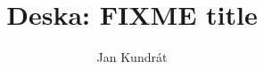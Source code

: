 \documentclass{book}
\begin{document}
\title{Deska: FIXME title}

\author{Jan Kundrát}

\maketitle




%
\end{document}
